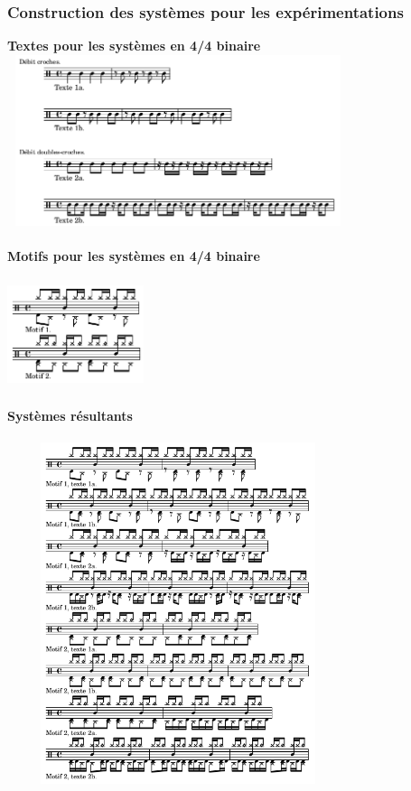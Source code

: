 \subsubsection{Construction des systèmes pour les expérimentations}
\textbf{Textes pour les systèmes en 4/4 binaire}\\
\includegraphics[height=50mm, width=100mm]{z_images/1_description_notation/systemes/0_textes_4-4_binaires.png}\\\\
\textbf{Motifs pour les systèmes en 4/4 binaire}\\\\
\includegraphics[height=30mm, width=40mm]{z_images/1_description_notation/systemes/1_motifs_4-4_binaires.png}\\\\
\textbf{Systèmes résultants}\\\\
\includegraphics[height=100mm, width=100mm]{z_images/3_experimentations/experience_1/systemes_recherches.png}\newpage